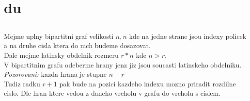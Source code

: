 \documentclass[a4paper]{article}
\begin{document}
\pagestyle{fancy}

\setcounter{section}{1}
\section{du}
\subsection{}
Mejme uplny bipartitni graf velikosti $n,n$ kde na jedne strane jsou indexy policek a
na druhe cisla ktera do nich budeme dosazovat.\\
Dale mejme latinsky obdelnik rozmeru $r*n$ kde $n>r$.\\
V bipartitnim grafu odeberme hrany jenz jiz jsou soucasti latinskeho obdelniku.\\
\textit{Pozorovani:} kazda hrana je stupne $n-r$\\
Tudiz radku $r+1$ pak bude na pozici kazdeho indexu mozno priradit rozdilne cislo.
Dle hran ktere vedou z daneho vrcholu v grafu do vrcholu s cislem. 
\end{document}
